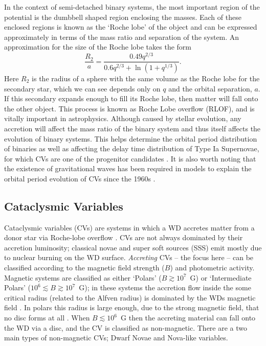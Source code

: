 In the context of semi-detached binary systems, the most important region of the 
potential is the dumbbell shaped region enclosing the masses. Each of these
enclosed regions is known as the `Roche lobe' of the object and can be expressed 
approximately in terms of the mass ratio and separation of the system. An approximation for the size of the Roche lobe takes the form \citep{eggleton1983}
\begin{equation}
\frac{R_2}{a} = \frac{0.49 q^{2/3}}{0.6q^{2/3} + \ln(1+q^{1/3})}.
\label{eq:roche2}
\end{equation} 
Here $R_2$ is the radius of a sphere with the same volume as the Roche lobe for the
secondary star, which we can see depends only on $q$ and the orbital separation, 
$a$. If this secondary expands enough to fill its Roche lobe, then matter
will fall onto the other object. This process is known as Roche Lobe overflow (RLOF),
and is vitally important in astrophysics. Although caused by stellar evolution,
any accretion will affect the mass ratio of the binary system 
and thus itself affects the evolution
of binary systems. This helps determine the orbital period
distribution of binaries \citep[e.g.][]{knigge2011_evo} 
as well as affecting the delay time distribution
of Type Ia Supernovae, for which CVs are one of the progenitor candidates 
\citep[e.g.][]{wang2012}.
It is also worth noting that the existence of gravitational waves has been 
required in models to explain the orbital period evolution of CVs since
the 1960s \citep{kraft1962}. 


\subsection{Cataclysmic Variables}

Cataclysmic variables (CVs) are systems in which a WD
accretes matter from a donor star via Roche-lobe overflow 
\citep[see the `CV bible', ][]{warnerbook}. 
CVs are not always dominated by their accretion luminosity; 
classical novae and super soft sources 
(SSS) emit mostly due to nuclear burning on the WD surface.
{\em Accreting} CVs -- the focus here -- can be classified according to the 
magnetic field strength ($B$) and photometric activity. 
Magnetic systems are classified as either `Polars' ($B \gtrsim 10^7$~G)
or `Intermediate Polars' ($10^6 \lesssim B \gtrsim 10^7$~G);
in these systems the accretion flow inside the some critical radius 
(related to the Alfven radius)
is dominated by the WDs magnetic field \citep[e.g.][]{patterson1994}. 
In polars this radius is large enough, due to the strong magnetic field,
that no disc forms at all \citep{liebert1985}.
When $B \lesssim 10^6$~G then the accreting material can fall
onto the WD via a disc, and the CV is classified as non-magnetic.
There are a two main types of non-magnetic CVs; Dwarf Novae and Nova-like
variables.

